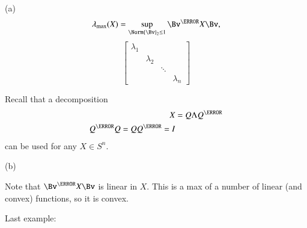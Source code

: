 (a)
\begin{equation}\label{eqn:convexOptimizationLecture8:500}
\lambda_{\max} (X) = \sup_{\Norm{\Bv}_2 \le 1} \Bv^\T X \Bv,
\end{equation}
%
\begin{equation}\label{eqn:convexOptimizationLecture8:520}
\begin{bmatrix}
\lambda_1 &           &        & \\
          & \lambda_2 &        & \\
          &           & \ddots & \\
          &           &        & \lambda_n
\end{bmatrix}
\end{equation}
%

Recall that a decomposition
%
\begin{equation}\label{eqn:convexOptimizationLecture8:540}
\begin{aligned}
X &= Q \Lambda Q^\T \\
Q^\T Q = Q Q^\T = I
\end{aligned}
\end{equation}
%
can be used for any \( X \in S^n \).

(b)

Note that \( \Bv^\T X \Bv \) is linear in \( X \).  This is a max of a number of linear (and convex) functions, so it is convex.

Last example:


